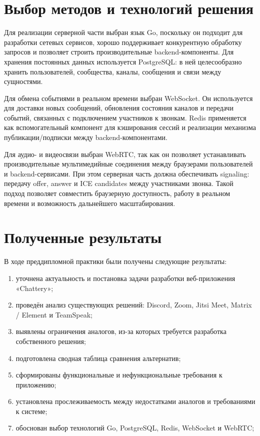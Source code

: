 \documentclass[a4paper,12pt]{extarticle}
\begin{document}
\newpage

\section{Выбор методов и технологий решения}

Для реализации серверной части выбран язык Go, поскольку он подходит для разработки сетевых сервисов, хорошо поддерживает конкурентную обработку запросов и позволяет строить производительные backend-компоненты. Для хранения постоянных данных используется PostgreSQL: в ней целесообразно хранить пользователей, сообщества, каналы, сообщения и связи между сущностями.

Для обмена событиями в реальном времени выбран WebSocket. Он используется для доставки новых сообщений, обновления состояния каналов и передачи событий, связанных с подключением участников к звонкам. Redis применяется как вспомогательный компонент для кэширования сессий и реализации механизма публикации/подписки между backend-компонентами.

Для аудио- и видеосвязи выбран WebRTC, так как он позволяет устанавливать производительные мультимедийные соединения между браузерами пользователей и backend-сервисами. При этом серверная часть должна обеспечивать signaling: передачу offer, answer и ICE candidates между участниками звонка. Такой подход позволяет совместить браузерную доступность, работу в реальном времени и возможность дальнейшего масштабирования.

\section{Полученные результаты}

В ходе преддипломной практики были получены следующие результаты:
\begin{enumerate}
    \item уточнена актуальность и постановка задачи разработки веб-приложения «Chattery»;
    \item проведён анализ существующих решений: Discord,  Zoom, Jitsi Meet, Matrix / Element и TeamSpeak;
    \item выявлены ограничения аналогов, из-за которых требуется разработка собственного решения;
    \item подготовлена сводная таблица сравнения альтернатив;
    \item сформированы функциональные и нефункциональные требования к приложению;
    \item установлена прослеживаемость между недостатками аналогов и требованиями к системе;
    \item обоснован выбор технологий Go, PostgreSQL, Redis, WebSocket и WebRTC;
\end{enumerate}
\end{document}
